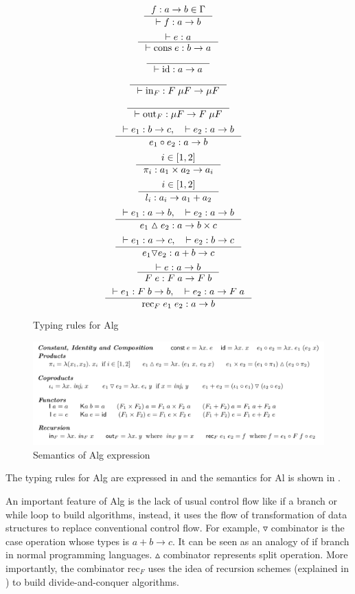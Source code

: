 \begin{figure}[ht]
    \[\inference{f : a -> b \in \Gamma}{|- f : a -> b}\]
    \[\inference{|- e : a}{|- \text{cons} \; e : b -> a}\]
    \[\inference{}{|- \text{id} : a -> a}\]
    \[\inference{}{|- \text{in}_F : F \; \mu F -> \mu F}\]
    \[\inference{}{|- \text{out}_F : \mu F -> F \; \mu F}\]
    \[\inference{|- e_1 : b -> c, \quad |- e_2 : a -> b}{e_1 \circ e_2: a -> b}\]
    \[\inference{i \in [1,2]}{\pi_i : a_1 \times a_2 -> a_i}\]
    \[\inference{i \in [1,2]}{l_i : a_i -> a_1 + a_2}\]
    \[\inference{|- e_1 : a -> b, \quad |- e_2 : a -> b}{e_1 \vartriangle e_2: a -> b \times c}\]
    \[\inference{|- e_1 : a -> c, \quad |- e_2 : b -> c}{e_1 \triangledown e_2: a + b -> c}\]
    \[\inference{|- e : a -> b}{F \; e : F \; a -> F \; b}\]
    \[\inference{|- e_1 : F \; b -> b, \quad |- e_2 : a -> F \; a}{\text{rec}_F \; e_1 \; e_2: a -> b}\]
    \caption{Typing rules for Alg}
    \label{project:typing}
\end{figure}
\begin{figure}[ht]
    \includegraphics[width=\textwidth]{project/semantics.png}
    \caption{Semantics of Alg expression\cite{AlgebraicMultipartyProtocol}} 
    \label{project:Semantics}
\end{figure}

The typing rules for Alg are expressed in  and the semantics for Al is shown in . 

An important feature of Alg is the lack of usual control flow like if a branch or while loop to build algorithms, instead, it uses the flow of transformation of data structures to replace conventional control flow. For example, $\triangledown$ combinator is the case operation whose types is $a + b \rightarrow c$. It can be seen as an analogy of if branch in normal programming languages. $\vartriangle$ combinator represents split operation. More importantly, the combinator $\text{rec}_F$ uses the idea of recursion schemes (explained in ) to build divide-and-conquer algorithms. 

